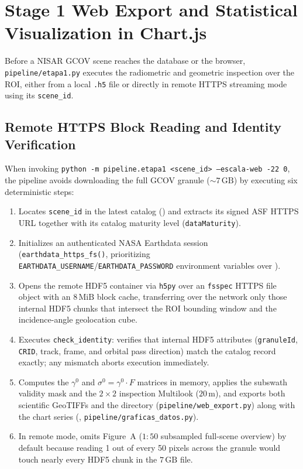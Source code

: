\documentclass[11pt,a4paper]{article}
\newcommand{\src}[1]{\nolinkurl{#1}}
\newcommand{\unit}[1]{\mathrm{#1}}
\newcommand{\gz}{\ensuremath{\gamma^{0}}}
\newcommand{\sz}{\ensuremath{\sigma^{0}}}
\begin{document}
\section{Stage 1 Web Export and Statistical Visualization in Chart.js}
\label{sec:arq-etapa1-chartjs}

Before a NISAR GCOV scene reaches the database or the browser, \src{pipeline/etapa1.py} executes the radiometric
and geometric inspection over the ROI, either from a local \texttt{.h5} file or directly in remote HTTPS streaming
mode using its \texttt{scene\_id}.

\subsection{Remote HTTPS Block Reading and Identity Verification}

When invoking \texttt{python -m pipeline.etapa1 <scene\_id> --escala-web -22 0}, the pipeline avoids downloading
the full GCOV granule ($\sim 7\,\unit{GB}$) by executing six deterministic steps:
\begin{enumerate}
  \item Locates \texttt{scene\_id} in the latest catalog () and extracts its
        signed ASF HTTPS URL together with its catalog maturity level (\texttt{dataMaturity}).
  \item Initializes an authenticated NASA Earthdata session (\texttt{earthdata\_https\_fs()}, prioritizing
        \texttt{EARTHDATA\_USERNAME}/\texttt{EARTHDATA\_PASSWORD} environment variables over ).
  \item Opens the remote HDF5 container via \texttt{h5py} over an \texttt{fsspec} HTTPS file object with an
        $8\,\unit{MiB}$ block cache, transferring over the network only those internal HDF5 chunks that intersect
        the ROI bounding window and the incidence-angle geolocation cube.
  \item Executes \texttt{check\_identity}: verifies that internal HDF5 attributes (\texttt{granuleId},
        \texttt{CRID}, track, frame, and orbital pass direction) match the catalog record exactly; any mismatch
        aborts execution immediately.
  \item Computes the $\gz$ and $\sz = \gz \cdot F$ matrices in memory, applies the subswath validity mask and
        the $2\times 2$ inspection Multilook ($20\,\unit{m}$), and exports both scientific GeoTIFFs and the
         directory (\src{pipeline/web\_export.py}) along with the chart series (,
        \src{pipeline/graficas\_datos.py}).
  \item In remote mode, omits Figure~A ($1:50$ subsampled full-scene overview) by default because reading 1 out of
        every 50 pixels across the granule would touch nearly every HDF5 chunk in the $7\,\unit{GB}$ file.
\end{enumerate}
\end{document}
